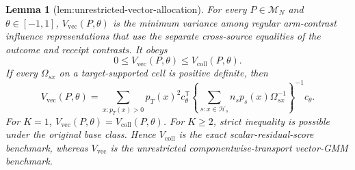 \documentclass{article}
\newtheorem{lemma}{Lemma}
\begin{document}
\begin{lemma}[lem:unrestricted-vector-allocation]\label{lem:unrestricted-vector-allocation}
For every \(P\in\mathcal M_N\) and \(\theta\in[-1,1]\), \(V_{\mathrm{vec}}(P,\theta)\) is the minimum variance among regular arm-contrast influence representations that use the separate cross-source equalities of the outcome and receipt contrasts. It obeys
\[
0\le V_{\mathrm{vec}}(P,\theta)\le V_{\mathrm{coll}}(P,\theta).
\]
If every \(\Omega_{sx}\) on a target-supported cell is positive definite, then
\[
V_{\mathrm{vec}}(P,\theta)
=\sum_{x:p_T(x)>0}p_T(x)^2c_\theta^{\mathsf T}
\left\{\sum_{s:x\in\mathcal H_s}n_sp_s(x)\Omega_{sx}^{-1}\right\}^{-1}
c_\theta.
\]
For \(K=1\), \(V_{\mathrm{vec}}(P,\theta)=V_{\mathrm{coll}}(P,\theta)\). For \(K\ge2\), strict inequality is possible under the original base class. Hence \(V_{\mathrm{coll}}\) is the exact scalar-residual-score benchmark, whereas \(V_{\mathrm{vec}}\) is the unrestricted componentwise-transport vector-GMM benchmark.
\end{lemma}
\end{document}
